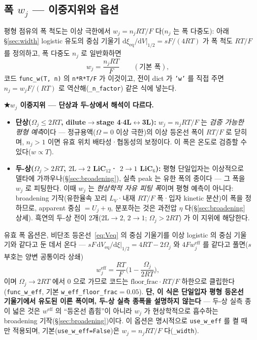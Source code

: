 \documentclass[11pt,a4paper]{article}
\newcommand{\dd}{\mathrm{d}}
\newcommand{\eff}{\mathrm{eff}}
\newcommand{\eq}{\mathrm{eq}}
\newcommand{\code}[1]{\texttt{#1}}
\begin{document}
\subsection{폭 $w_j$ — 이중지위와 옵션}
평형 점유의 폭 척도는 이상 극한에서 $w_j=n_jRT/F$ 다($n_j$ 는 폭 다중도): 아래 \S\ref{sec:width} logistic 유도의
중심 기울기 $\dd\xi_\eq/\dd V|_{1/2}=sF/(4RT)$ 가 폭 척도 $RT/F$ 를 정의하고, 폭 다중도 $n_j$ 로 일반화하면
\begin{equation}
w_j=\frac{n_jRT}{F}\qquad(\text{기본 폭}),
\label{eq:wbase}
\end{equation}
코드 \code{func\_w(T, n)} 의 \code{n*R*T/F}
가 이것이고, 전이 dict 가 \code{'w'} 를 직접 주면 $n_j=w_jF/(RT)$ 로 역산해(\code{\_n\_factor}) 같은 식에 넣는다.

\textbf{★$w_j$ 이중지위 — 단상과 두-상에서 해석이 다르다.}
\begin{itemize}[leftmargin=1.4em,itemsep=2pt]
\item \textbf{단상($\Omega_j\le2RT$, dilute$\to$stage 4$\cdot$4L$\leftrightarrow$3L):} $w_j=n_jRT/F$ 는
  \emph{검증 가능한 평형 예측}이다 — 정규용액($\Omega=0$ 이상 극한)의 이상 등온선 폭이 $RT/F$ 로 닫히며,
  $n_j>1$ 이면 유효 위치 배타성·협동성의 보정이다. 이 폭은 온도로 검증할 수 있다($w\propto T$).
\item \textbf{두-상($\Omega_j>2RT$, $2\mathrm{L}{\to}2$ LiC$_{12}$· $2{\to}1$ LiC$_6$):} 평형 단일입자는
  이상적으로 델타에 가까우나(\S\ref{sec:broadening}), 실측 peak 는 유한 폭의 종이다 — 그 폭을
  $w_j$ 로 피팅한다. 이때 $w_j$ 는 \emph{현상학적 자유 피팅 폭}이며 평형 예측이 아니다:
  broadening 기작(유한율속 꼬리 $L_V$·내재 $RT/F$ 폭·입자 kinetic 분산)이 폭을 정하므로,
  apparent 중심 $=U_j+\eta$, 분포하는 것은 과전압 $\eta$ 다(\S\ref{sec:broadening} 상세).
  흑연의 두-상 전이 2개($2\mathrm{L}{\to}2$, $2{\to}1$; $\Omega_j>2RT$) 가 이 지위에 해당한다.
\end{itemize}

유효 폭 옵션은, 비단조 등온선~\eqref{eq:Veq} 의 중심 기울기를 이상 logistic 의 중심 기울기와
같다고 둔 데서 온다 — $sF\,\dd V_\eq/\dd\xi|_{1/2}=4RT-2\Omega_j$ 와 $4Fw^\eff_j$ 를 같다고 풀면($s$ 부호는 양변 공통이라 상쇄)
\begin{equation}
w_j^\eff=\frac{RT}{F}\Big(1-\frac{\Omega_j}{2RT}\Big),
\label{eq:weff}
\end{equation}
이며 $\Omega_j\to2RT$ 에서 $0$ 으로 가므로 코드는 $\mathrm{floor\_frac}\cdot RT/F$ 하한으로 클립한다(\code{func\_w\_eff},
기본 \code{w\_eff\_floor\_frac}$=0.05$). \textbf{단, 이 식은 단일입자 평형 등온선 기울기에서 유도된 이론 폭이며,
두-상 실측 종폭을 설명하지 않는다} — 두-상 실측 종이 넓은 것은 $w^\eff$ 의 ``등온선 좁힘''이 아니라
$w_j$ 가 현상학적으로 흡수하는 broadening 기작(\S\ref{sec:broadening})이다. 이 옵션은 명시적으로
\code{use\_w\_eff} 를 켤 때만 적용되며, 기본(\code{use\_w\_eff=False})은 $w_j=n_jRT/F$ 다(\code{\_width}).
\end{document}
